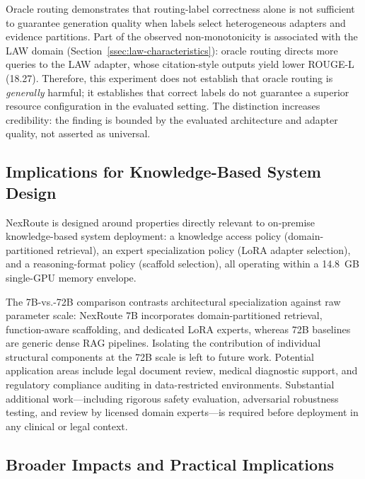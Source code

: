 \documentclass[a4paper,fleql,doubleblind]{cas-sc}
\begin{document}
Oracle routing demonstrates that routing-label correctness alone is not sufficient to
guarantee generation quality when labels select heterogeneous adapters and evidence
partitions.
Part of the observed non-monotonicity is associated with the LAW domain
(Section~\ref{ssec:law-characteristics}): oracle routing directs more queries to
the LAW adapter, whose citation-style outputs yield lower ROUGE-L (18.27).
Therefore, this experiment does not establish that oracle routing is \emph{generally}
harmful; it establishes that correct labels do not guarantee a superior resource
configuration in the evaluated setting.
The distinction increases credibility: the finding is bounded by the evaluated
architecture and adapter quality, not asserted as universal.

\subsection{Implications for Knowledge-Based System Design}

NexRoute is designed around properties directly relevant to on-premise knowledge-based
system deployment: a knowledge access policy (domain-partitioned retrieval),
an expert specialization policy (LoRA adapter selection), and a reasoning-format policy
(scaffold selection), all operating within a 14.8~GB single-GPU memory envelope.

The 7B-vs.-72B comparison contrasts architectural specialization against raw parameter
scale: NexRoute 7B incorporates domain-partitioned retrieval, function-aware scaffolding,
and dedicated LoRA experts, whereas 72B baselines are generic dense RAG pipelines.
Isolating the contribution of individual structural components at the 72B scale is left
to future work.
Potential application areas include legal document review, medical diagnostic support,
and regulatory compliance auditing in data-restricted environments.
Substantial additional work---including rigorous safety evaluation, adversarial
robustness testing, and review by licensed domain experts---is required before
deployment in any clinical or legal context.

\subsection{Broader Impacts and Practical Implications}
\end{document}
